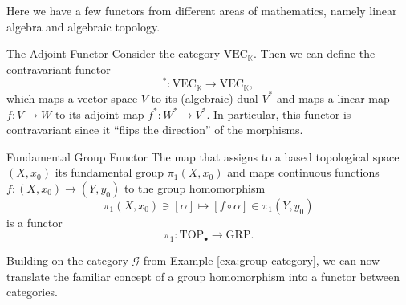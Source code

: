 Here we have a few functors from different areas of mathematics, namely linear algebra and algebraic topology.

\begin{example}{The Adjoint Functor \cite[Ex.~1.2.12]{Leinster2014-dc}}{}
Consider the category $\mathrm{VEC}_\mathbb{K}$. Then we can define the contravariant functor
$$
^* \colon \mathrm{VEC}_\mathbb{K} \to \mathrm{VEC}_\mathbb{K},
$$
which maps a vector space $V$ to its (algebraic) dual $V^*$ and maps a linear map $f\colon V \to W$ to its adjoint map $f^*\colon W^* \to V^*$. In particular, this functor is contravariant since it ``flips the direction'' of the morphisms.
\end{example}


\begin{example}{Fundamental Group Functor \cite[Sec.~1.1.2]{Hatcher2001}}{}
The map that assigns to a based topological space $(X,x_0)$ its fundamental group $\pi_1(X,x_0)$ and maps continuous functions $f\colon (X,x_0) \to (Y,y_0)$ to the group homomorphism 
$$
\pi_1(X,x_0) \ni [\alpha] \mapsto [f \circ \alpha] \in \pi_1(Y,y_0)
$$
is a functor
$$
\pi_1\colon \mathrm{TOP}_\bullet \to \mathrm{GRP}.
$$
\end{example}


Building on the category $\mathcal{G}$ from Example \ref{exa:group-category}, we can now translate the familiar concept of a group homomorphism into a functor between categories.

